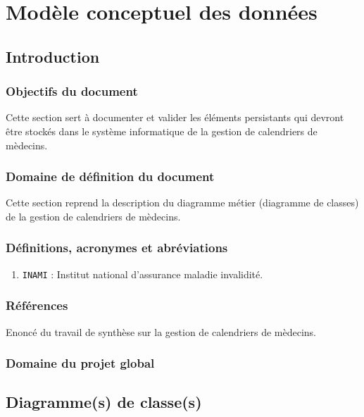 \documentclass[a4paper, 11pt]{report}
\begin{document}

\tableofcontents

\chapter{Modèle conceptuel des données}

\section{Introduction}

\subsection{Objectifs du document}

Cette section sert à documenter et valider les éléments persistants qui devront
être stockés dans le système informatique de la gestion de calendriers de mèdecins.

\subsection{Domaine de définition du document}

Cette section reprend la description du diagramme métier (diagramme de classes) de la gestion de 
calendriers de mèdecins.

\subsection{Définitions, acronymes et abréviations}

\begin{enumerate}

\item \texttt{INAMI} : Institut national d'assurance maladie invalidité.

\end{enumerate}

\subsection{Références}

Enoncé du travail de synthèse sur la gestion de calendriers de mèdecins.

\newpage
\subsection{Domaine du projet global}
\section{Diagramme(s) de classe(s)}
\end{document}
